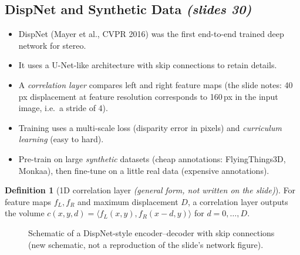 \documentclass[11pt,a4paper]{article}
\newcommand{\slr}[1]{\texorpdfstring{\emph{(slides #1)}}{(slides #1)}}
\theoremstyle{definition}
\newtheorem{definition}{Definition}[section]
\theoremstyle{plain}
\theoremstyle{remark}
\begin{document}
\subsection{DispNet and Synthetic Data \slr{30}}
\begin{itemize}
\item DispNet (Mayer et al., CVPR 2016) was the first end-to-end trained deep network for stereo.
\item It uses a U-Net-like architecture with skip connections to retain details.
\item A \emph{correlation layer} compares left and right feature maps (the slide notes: 40\,px displacement at feature resolution corresponds to 160\,px in the input image, i.e.\ a stride of 4).
\item Training uses a multi-scale loss (disparity error in pixels) and \emph{curriculum learning} (easy to hard).
\item Pre-train on large \emph{synthetic} datasets (cheap annotations: FlyingThings3D, Monkaa), then fine-tune on a little real data (expensive annotations).
\end{itemize}
\begin{definition}[1D correlation layer \emph{(general form, not written on the slide)}]
For feature maps $f_L,f_R$ and maximum displacement $D$, a correlation layer outputs the volume $c(x,y,d)=\langle f_L(x,y),f_R(x-d,y)\rangle$ for $d=0,\dots,D$.
\end{definition}
\begin{figure}[H]\centering
{}
\caption{Schematic of a DispNet-style encoder--decoder with skip connections (new schematic, not a reproduction of the slide's network figure).}
\end{figure}
\end{document}
